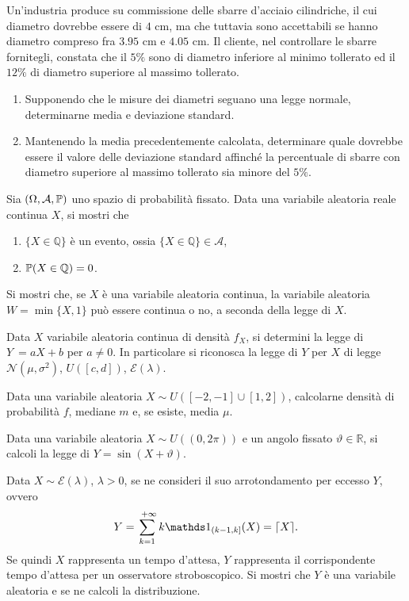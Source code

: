 Un'industria produce su commissione delle sbarre d'acciaio cilindriche, il cui diametro dovrebbe essere di $4$ cm, ma che tuttavia sono accettabili se hanno diametro compreso fra $3.95$ cm e $4.05$ cm. Il cliente, nel controllare le sbarre fornitegli, constata che il $5\%$ sono di diametro inferiore al minimo tollerato ed il $12\%$ di diametro superiore al massimo tollerato.
\begin{enumerate}
\item Supponendo che le misure dei diametri seguano una legge normale, determinarne media e deviazione standard.
\item Mantenendo la media precedentemente calcolata, determinare quale dovrebbe essere il valore delle deviazione standard affinché la percentuale di sbarre con diametro superiore al massimo tollerato sia minore del $5\%$.
\end{enumerate}
\Esercizio{}

Sia $( \Omega ,\mathcal{A} ,\mathbb{P})$ uno spazio di probabilità fissato. Data una variabile aleatoria reale continua $X$, si mostri che
\begin{enumerate}
\item $\{X\in \mathbb{Q}\}$ è un evento, ossia $\{X\in \mathbb{Q}\} \in \mathcal{A}$,
\item $\mathbb{P}( X\in \mathbb{Q}) =0$.
\end{enumerate}
\Esercizio{}

Si mostri che, se $X$ è una variabile aleatoria continua, la variabile aleatoria $W=\min\{X,1\}$ può essere continua o no, a seconda della legge di $X$.
\Esercizio{}

Data $X$ variabile aleatoria continua di densità $f_{X}$, si determini la legge di $Y\ =aX+b$ per $a\neq 0$. In particolare si riconosca la legge di $Y$ per $X$ di legge $\mathcal{N}\left( \mu ,\sigma ^{2}\right)$, $U([ c,d])$, $\mathcal{E}( \lambda )$.
\Esercizio{}

Data una variabile aleatoria $X\sim U([ -2,-1] \cup [ 1,2])$, calcolarne densità di probabilità $f$, mediane $m$ e, se esiste, media $\mu $.
\Esercizio{$\star$}

Data una variabile aleatoria $X\sim U(( 0,2\pi ))$ e un angolo fissato $\vartheta \in \mathbb{R}$, si calcoli la legge di $Y=\sin( X+\vartheta )$.
\Esercizio{}

Data $X\sim \mathcal{E}( \lambda )$, $\lambda  >0$, se ne consideri il suo arrotondamento per eccesso $Y$, ovvero
\begin{equation*}
Y=\sum\limits _{k=1}^{\ +\infty } k\Ind_{( k-1,k]}( X) =\lceil X\rceil .
\end{equation*}
Se quindi $X$ rappresenta un tempo d'attesa, $Y$ rappresenta il corrispondente tempo d'attesa per un osservatore stroboscopico. Si mostri che $Y$ è una variabile aleatoria e se ne calcoli la distribuzione.
\Esercizio{}

